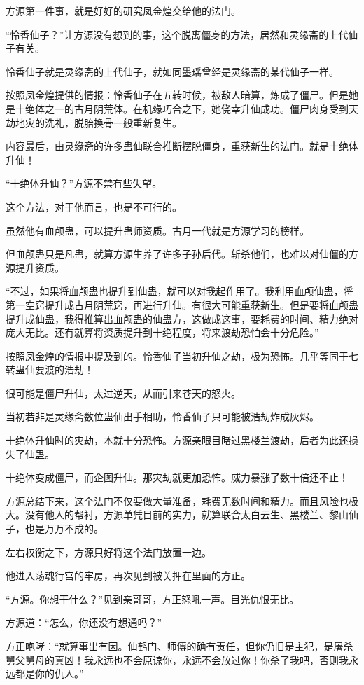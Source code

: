\begin{this_body}
方源第一件事，就是好好的研究凤金煌交给他的法门。

“怜香仙子？”让方源没有想到的事，这个脱离僵身的方法，居然和灵缘斋的上代仙子有关。

怜香仙子就是灵缘斋的上代仙子，就如同墨瑶曾经是灵缘斋的某代仙子一样。

按照凤金煌提供的情报：怜香仙子在五转时候，被敌人暗算，炼成了僵尸。但是她是十绝体之一的古月阴荒体。在机缘巧合之下，她侥幸升仙成功。僵尸肉身受到天劫地灾的洗礼，脱胎换骨一般重新复生。

内容最后，由灵缘斋的许多蛊仙联合推断摆脱僵身，重获新生的法门。就是十绝体升仙！

“十绝体升仙？”方源不禁有些失望。

这个方法，对于他而言，也是不可行的。

虽然他有血颅蛊，可以提升蛊师资质。古月一代就是方源学习的榜样。

但血颅蛊只是凡蛊，就算方源生养了许多子孙后代。斩杀他们，也难以对仙僵的方源提升资质。

“不过，如果将血颅蛊也提升到仙蛊，就可以对我起作用了。我利用血颅仙蛊，将第一空窍提升成古月阴荒窍，再进行升仙。有很大可能重获新生。但是要将血颅蛊提升成仙蛊，我得推算出血颅蛊的仙蛊方，这做成这事，要耗费的时间、精力绝对庞大无比。还有就算将资质提升到十绝程度，将来渡劫恐怕会十分危险。”

按照凤金煌的情报中提及到的。怜香仙子当初升仙之劫，极为恐怖。几乎等同于七转蛊仙要渡的浩劫！

很可能是僵尸升仙，太过逆天，从而引来苍天的怒火。

当初若非是灵缘斋数位蛊仙出手相助，怜香仙子只可能被浩劫炸成灰烬。

十绝体升仙时的灾劫，本就十分恐怖。方源亲眼目睹过黑楼兰渡劫，后者为此还损失了仙蛊。

十绝体变成僵尸，而企图升仙。那灾劫就更加恐怖。威力暴涨了数十倍还不止！

方源总结下来，这个法门不仅要做大量准备，耗费无数时间和精力。而且风险也极大。没有他人的帮衬，方源单凭目前的实力，就算联合太白云生、黑楼兰、黎山仙子，也是万万不成的。

左右权衡之下，方源只好将这个法门放置一边。

他进入荡魂行宫的牢房，再次见到被关押在里面的方正。

“方源。你想干什么？”见到亲哥哥，方正怒吼一声。目光仇恨无比。

方源道：“怎么，你还没有想通吗？”

方正咆哮：“就算事出有因。仙鹤门、师傅的确有责任，但你仍旧是主犯，是屠杀舅父舅母的真凶！我永远也不会原谅你，永远不会放过你！你杀了我吧，否则我永远都是你的仇人。”


\end{this_body}
